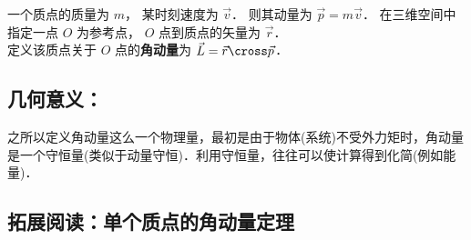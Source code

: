一个质点的质量为 $m$， 某时刻速度为 $\vec v$． 则其动量为 $\vec p = m\vec v$． 在三维空间中指定一点 $O$ 为参考点， $O$ 点到质点的矢量为 $\vec r$． \\
定义该质点关于 $O$ 点的\textbf{角动量}为 $\vec L = \vec r \cross \vec p$． 
\subsection{几何意义：}

之所以定义角动量这么一个物理量，最初是由于物体(系统)不受外力矩时，角动量是一个守恒量(类似于动量守恒)．利用守恒量，往往可以使计算得到化简(例如能量)．
\subsection{拓展阅读：单个质点的角动量定理}%
